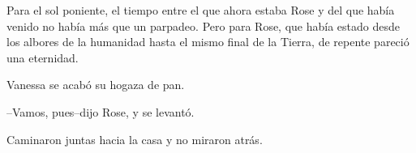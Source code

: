 Para el sol poniente, el tiempo entre el que ahora estaba Rose y del que
había venido no había más que un parpadeo. Pero para Rose, que había
estado desde los albores de la humanidad hasta el mismo final de la
Tierra, de repente pareció una eternidad.

Vanessa se acabó su hogaza de pan.

--Vamos, pues--dijo Rose, y se levantó.

Caminaron juntas hacia la casa y no miraron atrás.
